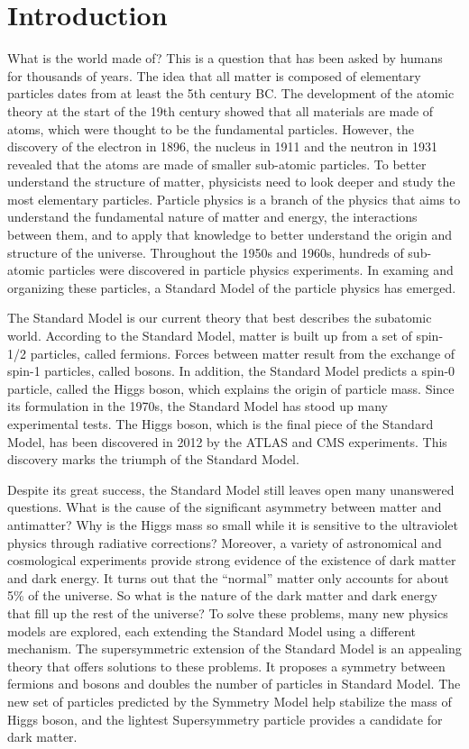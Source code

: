 \documentclass[12pt,twoside]{memoir}
\begin{document}

\chapter{Introduction}
What is the world made of? This is a question that has been asked by humans for thousands of years. 
The idea that all matter is composed of elementary particles dates from at least the 5th century BC. 
The development of the atomic theory at the start of the 19th century showed that all materials are 
made of atoms, which were thought to be the fundamental particles. However, the discovery of the electron 
in 1896, the nucleus in 1911 and the neutron in 1931 revealed that the atoms are made of smaller sub-atomic particles. 
To better understand the structure of matter, physicists need to look deeper and study the most elementary particles. 
Particle physics is a branch of the physics that aims to understand the fundamental nature of matter and energy, 
the interactions between them, and to apply that knowledge to better understand the origin and structure of the universe. 
Throughout the 1950s and 1960s, hundreds of sub-atomic particles were discovered in particle physics experiments.
In examing and organizing these particles, a Standard Model of the particle physics has emerged.

The Standard Model is our current theory that best describes the subatomic world. 
According to the Standard Model, matter is built up from a set of spin-1/2 particles, called fermions. 
Forces between matter result from the exchange of spin-1 particles, called bosons. 
In addition, the Standard Model predicts a spin-0 particle, called the Higgs boson, which explains the origin of particle mass. 
Since its formulation in the 1970s, the Standard Model has stood up many experimental tests. 
The Higgs boson, which is the final piece of the Standard Model, has been discovered in 2012 by the ATLAS and CMS experiments. 
This discovery marks the triumph of the Standard Model. 

Despite its great success, the Standard Model still leaves open many unanswered questions. 
What is the cause of the significant asymmetry between matter and antimatter? 
Why is the Higgs mass so small while it is sensitive to the ultraviolet physics through radiative corrections?
Moreover, a variety of astronomical and cosmological experiments provide strong evidence of the existence of dark matter and dark energy. 
It turns out that the ``normal'' matter only accounts for about 5\% of the universe. 
So what is the nature of the dark matter and dark energy that fill up the rest of the universe? 
To solve these problems, many new physics models are explored, each extending the Standard Model using a different mechanism. 
The supersymmetric extension of the Standard Model is an appealing theory that offers solutions to these problems.
It proposes a symmetry between fermions and bosons and doubles the number of particles in Standard Model. 
The new set of particles predicted by the Symmetry Model help stabilize the mass of Higgs boson, and the lightest Supersymmetry particle provides a candidate for dark matter. 
\end{document}
